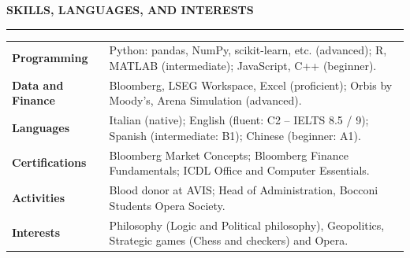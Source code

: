 \documentclass[10pt,letterpaper]{article}
\newcommand{\cvsection}[1]{%
    \vspace{5pt}%
    {\large\textbf{\MakeUppercase{#1}}}%
    \vspace{2pt}
    \hrule%
    \vspace{5pt}%
}
\begin{document}

\cvsection{Skills, Languages, and Interests}

\begin{tabularx}{\textwidth}{@{}lX@{}}

\textbf{Programming} &
Python: pandas, NumPy, scikit-learn, etc. (advanced); R, MATLAB (intermediate); JavaScript, C++ (beginner). \\[2pt]

\textbf{Data and Finance} &
Bloomberg, LSEG Workspace, Excel (proficient); Orbis by Moody's, Arena Simulation (advanced). \\[2pt]

\textbf{Languages} &
Italian (native); English (fluent: C2 -- IELTS 8.5 / 9); Spanish (intermediate: B1); Chinese (beginner: A1). \\[2pt]

\textbf{Certifications} &
Bloomberg Market Concepts; Bloomberg Finance Fundamentals; ICDL Office and Computer Essentials. \\[2pt]

\textbf{Activities} &
Blood donor at AVIS; Head of Administration, Bocconi Students Opera Society. \\[2pt]

\textbf{Interests} &
Philosophy (Logic and Political philosophy), Geopolitics, Strategic games (Chess and checkers) and Opera.

\end{tabularx}
\end{document}
